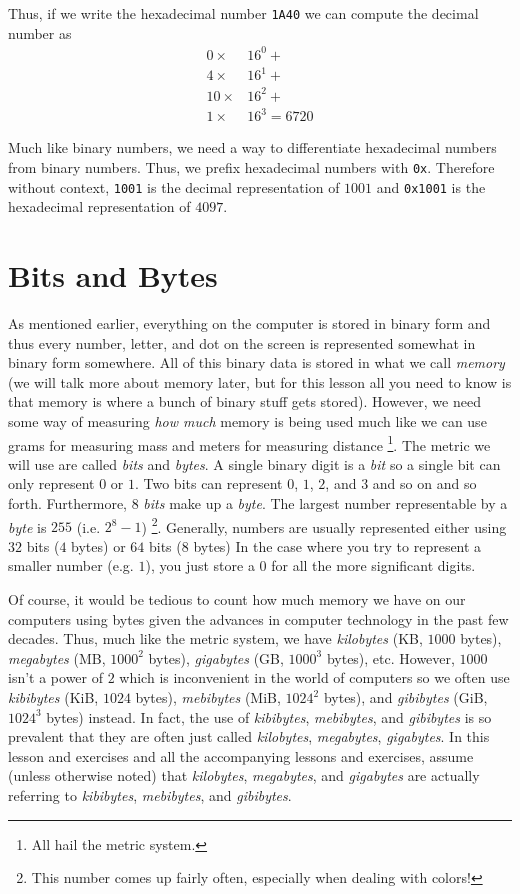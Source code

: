 \documentclass{article}
\begin{document}
Thus, if we write the hexadecimal number \lstinline{1A40} we can compute the decimal number as 
\begin{align}
0 \times & 16^0 + \\
4 \times & 16^1 + \\
10 \times & 16^2 + \\
1 \times & 16^3 = 6720
\end{align}

Much like binary numbers, we need a way to differentiate hexadecimal numbers from binary numbers.
Thus, we prefix hexadecimal numbers with \lstinline{0x}.
Therefore without context, \lstinline{1001} is the decimal representation of $1001$ and \lstinline{0x1001} is the hexadecimal representation of $4097$.

\section{Bits and Bytes}

As mentioned earlier, everything on the computer is stored in binary form and thus every number, letter, and dot on the screen is represented somewhat in binary form somewhere.
All of this binary data is stored in what we call \textit{memory} (we will talk more about memory later, but for this lesson all you need to know is that memory is where a bunch of binary stuff gets stored).
However, we need some way of measuring \textit{how much} memory is being used much like we can use grams for measuring mass and meters for measuring distance \footnote{All hail the metric system.}.
The metric we will use are called \textit{bits} and \textit{bytes}.  
A single binary digit is a \textit{bit} so a single bit can only represent $0$ or $1$.
Two bits can represent $0$, $1$, $2$, and $3$ and so on and so forth.
Furthermore, $8$ \textit{bits} make up a \textit{byte}.
The largest number representable by a \textit{byte} is $255$ (i.e. $2^8 - 1$) \footnote{This number comes up fairly often, especially when dealing with colors!}.
Generally, numbers are usually represented either using $32$ bits ($4$ bytes) or $64$ bits ($8$ bytes)
In the case where you try to represent a smaller number (e.g. $1$), you just store a $0$ for all the more significant digits.

Of course, it would be tedious to count how much memory we have on our computers using bytes given the advances in computer technology in the past few decades.
Thus, much like the metric system, we have \textit{kilobytes} (KB, $1000$ bytes), \textit{megabytes} (MB, $1000^2$ bytes), \textit{gigabytes} (GB, $1000^3$ bytes), etc.
However, $1000$ isn't a power of $2$ which is inconvenient in the world of computers so we often use \textit{kibibytes} (KiB, $1024$ bytes), \textit{mebibytes} (MiB, $1024^2$ bytes), and \textit{gibibytes} (GiB, $1024^3$ bytes) instead.
In fact, the use of \textit{kibibytes}, \textit{mebibytes}, and \textit{gibibytes} is so prevalent that they are often just called \textit{kilobytes}, \textit{megabytes}, \textit{gigabytes}.
In this lesson and exercises and all the accompanying lessons and exercises, assume (unless otherwise noted) that \textit{kilobytes}, \textit{megabytes}, and \textit{gigabytes} are actually referring to \textit{kibibytes}, \textit{mebibytes}, and \textit{gibibytes}.
\end{document}
